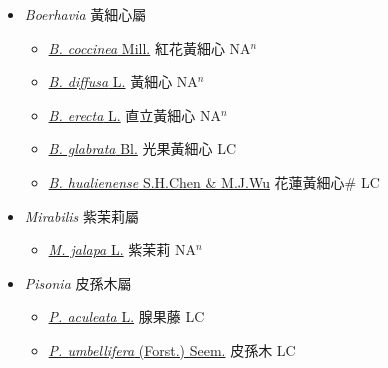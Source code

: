 
  \begin{itemize}
 \item[] \textit{Boerhavia} 黃細心屬
                    
  \begin{itemize}
        \item[] \href{http://www.theplantlist.org/tpl1.1/search?q=Boerhavia+coccinea}{\textit{B. coccinea} Mill.}   紅花黃細心 NA$^n$
        \item[] \href{http://www.theplantlist.org/tpl1.1/search?q=Boerhavia+diffusa}{\textit{B. diffusa} L.}   黃細心 NA$^n$
        \item[] \href{http://www.theplantlist.org/tpl1.1/search?q=Boerhavia+erecta}{\textit{B. erecta} L.}   直立黃細心 NA$^n$
        \item[] \href{http://www.theplantlist.org/tpl1.1/search?q=Boerhavia+glabrata}{\textit{B. glabrata} Bl.}   光果黃細心 LC
        \item[] \href{http://www.theplantlist.org/tpl1.1/search?q=Boerhavia+hualienense}{\textit{B. hualienense} S.H.Chen \& M.J.Wu}   花蓮黃細心\# LC
  \end{itemize}
 \item[] \textit{Mirabilis} 紫茉莉屬
                    
  \begin{itemize}
        \item[] \href{http://www.theplantlist.org/tpl1.1/search?q=Mirabilis+jalapa}{\textit{M. jalapa} L.}   紫茉莉 NA$^n$
  \end{itemize}
 \item[] \textit{Pisonia} 皮孫木屬
                    
  \begin{itemize}
        \item[] \href{http://www.theplantlist.org/tpl1.1/search?q=Pisonia+aculeata}{\textit{P. aculeata} L.}   腺果藤 LC
        \item[] \href{http://www.theplantlist.org/tpl1.1/search?q=Pisonia+umbellifera}{\textit{P. umbellifera} (Forst.) Seem.}   皮孫木 LC
  \end{itemize}
  \end{itemize}
